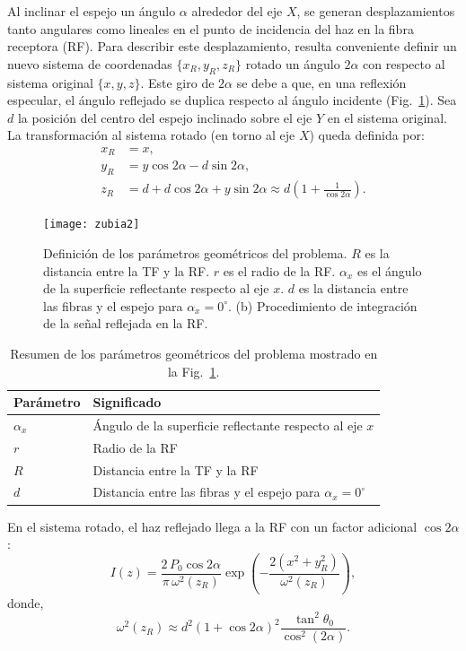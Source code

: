 \documentclass[11pt,a4paper]{article}
\begin{document}
\begin{multicols}{2}
Al inclinar el espejo un ángulo $\alpha$ alrededor del eje $X$, se generan desplazamientos tanto angulares como lineales en el punto de incidencia del haz en la fibra receptora (RF). Para describir este desplazamiento, resulta conveniente definir un nuevo sistema de coordenadas $\{x_R,y_R,z_R\}$ rotado un ángulo $2\alpha$ con respecto al sistema original $\{x,y,z\}$. Este giro de $2\alpha$ se debe a que, en una reflexión especular, el ángulo reflejado se duplica respecto al ángulo incidente (Fig.~\ref{fig:5_02}). Sea $d$ la posición del centro del espejo inclinado sobre el eje $Y$ en el sistema original. La transformación al sistema rotado (en torno al eje $X$) queda definida por:
\begin{align}
    x_R &= x,\\[6pt]
    y_R &= y \cos 2\alpha - d \sin 2\alpha,\\[6pt]
    z_R &= d + d \cos 2\alpha + y\sin 2\alpha \approx d\left(1 + \frac{1}{\cos 2\alpha}\right).
    \label{eq:equ2}
\end{align}
%
%
\begin{figure}[t]
    \centering
    \texttt{[image: zubia2]}
    \caption{Definición de los parámetros geométricos del problema. $R$ es la distancia entre la TF y la RF. $r$ es el radio de la RF. $\alpha_x$ es el ángulo de la superficie reflectante respecto al eje $x$. $d$ es la distancia entre las fibras y el espejo para $\alpha_x=0^\circ$. (b) Procedimiento de integración de la señal reflejada en la RF.}
    \label{fig:5_02}
\end{figure}
%
%
\begin{table}[!]
    \centering
    \caption{Resumen de los parámetros geométricos del problema mostrado en la Fig.~\ref{fig:5_02}.}
    \label{tab:5_01}
    \begin{tabular}{ll}
        \hline
        \textbf{Parámetro} & \textbf{Significado} \\
        \hline
        $\alpha_x$ & Ángulo de la superficie reflectante respecto al eje $x$ \\
        $r$ & Radio de la RF \\
        $R$ & Distancia entre la TF y la RF \\
        $d$ & Distancia entre las fibras y el espejo para $\alpha_x=0^\circ$ \\
        \hline
    \end{tabular}
\end{table}
\noindent En el sistema rotado, el haz reflejado llega a la RF con un factor adicional $\cos 2\alpha$:
\begin{equation}
    I(z)=\frac{2\,P_0 \cos 2\alpha}{\pi\,\omega^2(z_{R})}\exp\!\left(-\frac{2(x^2 + y_R^2)}{\omega^2(z_{R})}\right),
    \label{eq:equ3}
\end{equation}
donde,
\begin{equation}
    \omega^2(z_{R})\approx d^2 (1+\cos 2\alpha)^2\frac{\tan^2 \theta_0}{\cos^2(2\alpha)}.
\end{equation}

\end{multicols}
\end{document}
